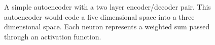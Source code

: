 \begin{figure}
\centering

\caption{
A simple autoencoder with a two layer encoder/decoder pair. This autoencoder
would code a five dimensional space into a three dimensional space. Each neuron represents a weighted sum passed through an activation function.
}
\label{autoenc}
\end{figure}
